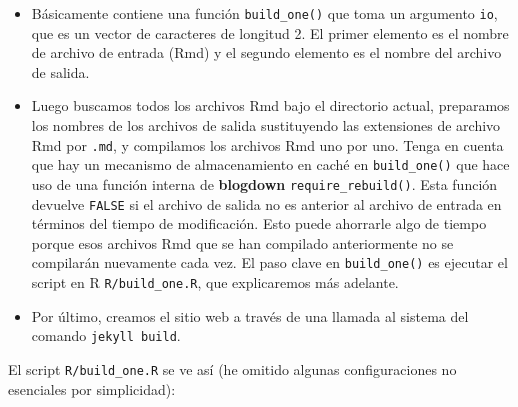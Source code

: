\documentclass[12pt,]{krantz}
\theoremstyle{definition}
\theoremstyle{definition}
\theoremstyle{definition}
\theoremstyle{remark}
\begin{document}
\begin{itemize}
\item
  Básicamente contiene una función
  \texttt{build\_one()} que toma un argumento \texttt{io}, que es un
  vector de caracteres de longitud 2. El primer elemento es el nombre de
  archivo de entrada (Rmd) y el segundo elemento es el nombre del
  archivo de salida.
\item
  Luego buscamos todos los archivos Rmd bajo el directorio actual,
  preparamos los nombres de los archivos de salida sustituyendo las
  extensiones de archivo Rmd por \texttt{.md}, y compilamos los archivos
  Rmd uno por uno. Tenga en cuenta que hay un mecanismo de
  almacenamiento en caché en \texttt{build\_one()} que hace uso de una
  función interna de \textbf{blogdown} \texttt{require\_rebuild()}. Esta
  función devuelve \texttt{FALSE} si el archivo de salida no es anterior
  al archivo de entrada en términos del tiempo de modificación. Esto
  puede ahorrarle algo de tiempo porque esos archivos Rmd que se han
  compilado anteriormente no se compilarán nuevamente cada vez. El paso
  clave en \texttt{build\_one()} es ejecutar el script en R
  \texttt{R/build\_one.R}, que explicaremos más adelante.
\item
  Por último, creamos el sitio web a través de una llamada al sistema
  del comando \texttt{jekyll\ build}.
\end{itemize}

El script \texttt{R/build\_one.R} se ve así (he omitido algunas
configuraciones no esenciales por simplicidad):
\end{document}
